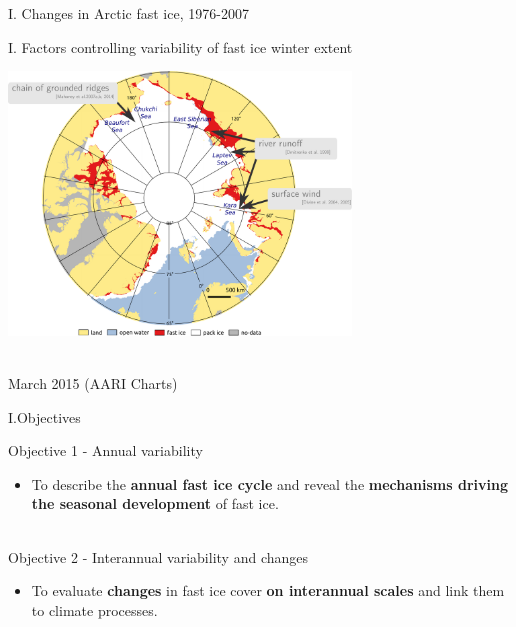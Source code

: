 \documentclass[8pt]{beamer}
\newcommand\Fontvi{\fontsize{6}{7.2}\selectfont}
\begin{document}
\begin{frame}[fragile]{I. Changes in Arctic fast ice, 1976-2007}
\end{frame}

\setwatermark{\fontsize{125pt}{125pt}\selectfont{}}
\begin{frame}[fragile]{I. Factors controlling variability of fast ice winter extent}
	\begin{center}
		\includegraphics[height=7cm]{./img/ArcticSI_Mar2015_FI_know.pdf}\\
	\end{center}
	~\\
	\Fontvi
	17 March 2015 (AARI Charts)
\end{frame}

\setwatermark{\fontsize{125pt}{125pt}\selectfont{}}
\begin{frame}[fragile]{I.Objectives}
		
	Objective 1 -  Annual variability
		\begin{itemize}
			\item To describe the \textbf{annual fast ice cycle} and 
		reveal the \textbf{mechanisms driving the seasonal development} of fast ice.\\~\\
		\end{itemize}
	Objective 2 - Interannual variability and changes
		\begin{itemize}
			\item To evaluate \textbf{changes} in fast ice cover \textbf{on interannual scales} and 
		link them to climate processes.
		\end{itemize}

\end{frame}
\end{document}
